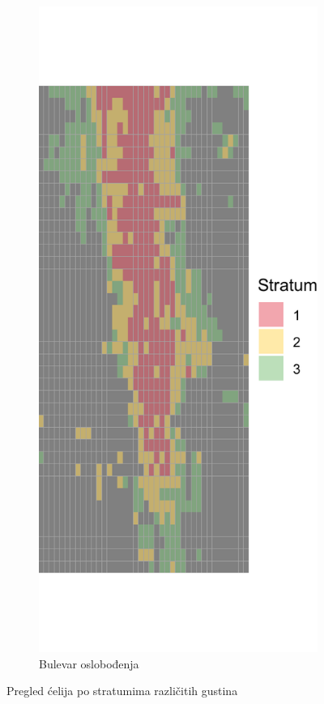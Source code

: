 \documentclass[a4paper,12pt]{article}
\begin{document}
\begin{figure}[H]
\begin{subfigure}[b]{0.3\textwidth}
	  \label{fig:kralja-milana}
	\end{subfigure}
	\hfill
	\begin{subfigure}[b]{0.3\textwidth}
	  \centering
	  \includegraphics[width=\textwidth]{../outputs/grid_output/strata_viz/bulevar-oslobodjenja_strata.png}
	  \caption{Bulevar oslobođenja}
	  \label{fig:bulevar-oslobodjenja}
	\end{subfigure}
  
	\caption{Pregled ćelija po stratumima različitih gustina}
\end{figure}
\end{document}
